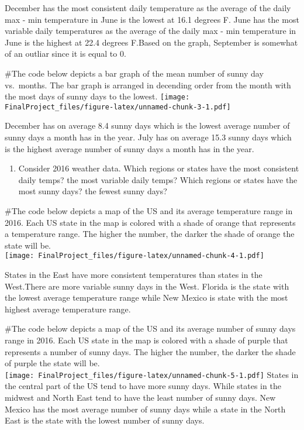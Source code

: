 \documentclass[
]{article}
\providecommand{\tightlist}{%
  \setlength{\itemsep}{0pt}\setlength{\parskip}{0pt}}
\begin{document}
December has the most consistent daily temperature as the average of the
daily max - min temperature in June is the lowest at 16.1 degrees F.
June has the most variable daily temperatures as the average of the
daily max - min temperature in June is the highest at 22.4 degrees
F.Based on the graph, September is somewhat of an outliar since it is
equal to 0.

\#The code below depicts a bar graph of the mean number of sunny day
vs.~months. The bar graph is arranged in decending order from the month
with the most days of sunny days to the lowest.
\texttt{[image: FinalProject\_files/figure-latex/unnamed-chunk-3-1.pdf]}

December has on average 8.4 sunny days which is the lowest average
number of sunny days a month has in the year. July has on average 15.3
sunny days which is the highest average number of sunny days a month has
in the year.

\begin{enumerate}
\def\labelenumi{\arabic{enumi}.}
\setcounter{enumi}{1}
\tightlist
\item
  Consider 2016 weather data. Which regions or states have the most
  consistent daily temps? the most variable daily temps? Which regions
  or states have the most sunny days? the fewest sunny days?
\end{enumerate}

\#The code below depicts a map of the US and its average temperature
range in 2016. Each US state in the map is colored with a shade of
orange that represents a temperature range. The higher the number, the
darker the shade of orange the state will be.\\
\texttt{[image: FinalProject\_files/figure-latex/unnamed-chunk-4-1.pdf]}

States in the East have more consistent temperatures than states in the
West.There are more variable sunny days in the West. Florida is the
state with the lowest average temperature range while New Mexico is
state with the most highest average temperature range.

\#The code below depicts a map of the US and its average number of sunny
days range in 2016. Each US state in the map is colored with a shade of
purple that represents a number of sunny days. The higher the number,
the darker the shade of purple the state will be.\\
\texttt{[image: FinalProject\_files/figure-latex/unnamed-chunk-5-1.pdf]}
States in the central part of the US tend to have more sunny days. While
states in the midwest and North East tend to have the least number of
sunny days. New Mexico has the most average number of sunny days while a
state in the North East is the state with the lowest number of sunny
days.
\end{document}
